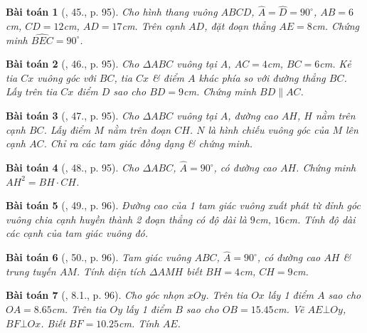 \documentclass{article}
\newtheorem{baitoan}{Bài toán}
\begin{document}
\begin{baitoan}[\cite{SBT_Toan_8_tap_2}, 45., p. 95]
	Cho hình thang vuông $ABCD$, $\widehat{A} = \widehat{D} = 90^\circ$, $AB = 6$\emph{cm}, $CD = 12$\emph{cm}, $AD = 17$\emph{cm}. Trên cạnh $AD$, đặt đoạn thẳng $AE = 8$\emph{cm}. Chứng minh $\widehat{BEC} = 90^\circ$.
\end{baitoan}

\begin{baitoan}[\cite{SBT_Toan_8_tap_2}, 46., p. 95]
	Cho $\Delta ABC$ vuông tại $A$, $AC = 4$\emph{cm}, $BC = 6$\emph{cm}. Kẻ tia $Cx$ vuông góc với $BC$, tia $Cx$ \& điểm $A$ khác phía so với đường thẳng $BC$. Lấy trên tia $Cx$ điểm $D$ sao cho $BD = 9$\emph{cm}. Chứng minh $BD\parallel AC$.
\end{baitoan}

\begin{baitoan}[\cite{SBT_Toan_8_tap_2}, 47., p. 95]
	Cho $\Delta ABC$ vuông tại $A$, đường cao $AH$, $H$ nằm trên cạnh $BC$. Lấy điểm $M$ nằm trên đoạn $CH$. $N$ là hình chiếu vuông góc của $M$ lên cạnh $AC$. Chỉ ra các tam giác đồng dạng \& chứng minh.
\end{baitoan}

\begin{baitoan}[\cite{SBT_Toan_8_tap_2}, 48., p. 95]
	Cho $\Delta ABC$, $\widehat{A} = 90^\circ$, có đường cao $AH$. Chứng minh $AH^2 = BH\cdot CH$.
\end{baitoan}

\begin{baitoan}[\cite{SBT_Toan_8_tap_2}, 49., p. 96]
	Đường cao của 1 tam giác vuông xuất phát từ đỉnh góc vuông chia cạnh huyền thành 2 đoạn thẳng có độ dài là $9$\emph{cm}, $16$\emph{cm}. Tính độ dài các cạnh của tam giác vuông đó.
\end{baitoan}

\begin{baitoan}[\cite{SBT_Toan_8_tap_2}, 50., p. 96]
	Tam giác vuông $ABC$, $\widehat{A} = 90^\circ$, có đường cao $AH$ \& trung tuyến $AM$. Tính diện tích $\Delta AMH$ biết $BH = 4$\emph{cm}, $CH = 9$\emph{cm}.
\end{baitoan}

\begin{baitoan}[\cite{SBT_Toan_8_tap_2}, 8.1., p. 96]
	Cho góc nhọn $xOy$. Trên tia $Ox$ lấy 1 điểm $A$ sao cho $OA = 8.65$\emph{cm}. Trên tia $Oy$ lấy 1 điểm $B$ sao cho $OB = 15.45$\emph{cm}. Vẽ $AE\bot Oy$, $BF\bot Ox$. Biết $BF = 10.25$\emph{cm}. Tính $AE$.
\end{baitoan}
\end{document}
